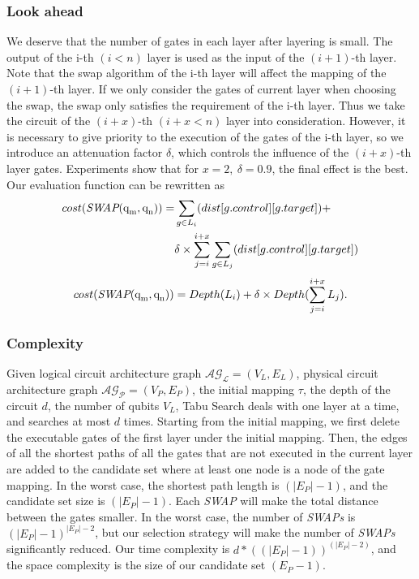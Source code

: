 \documentclass[runningheads]{llncs}
\begin{document}
\subsubsection{Look ahead }
We deserve that the number of gates in each layer after layering is small. The output of the i-th $(i<n)$ layer is used as the input of the $(i+1)$-th layer. Note that the swap algorithm of the i-th layer will affect the mapping of the $(i+1)$-th layer. If we only consider the gates of current layer when choosing the swap, the swap only satisfies the requirement of the i-th layer. Thus we take the circuit of the $(i+x)$-th $(i+x< n)$ layer into consideration. However, it is necessary to give priority to the execution of the gates of the i-th layer, so we introduce an attenuation factor $\delta$, which controls the influence of the $(i+x)$-th layer gates. Experiments show that for $x=2,\ \delta=0.9$, the final effect is the best. Our evaluation function can be rewritten as
 \begin{equation}
	 	\begin{aligned}
			cost(\textit{SWAP}(\textup{q}_\textup{m},\textup{q}_\textup{n}))=&\sum_{g \in L_{i}}(dist[g.control][g.target])+\\
	&\delta \times \sum_{j=i}^{i+x}\sum_{g \in L_{j}}(dist[g.control][g.target])
	\label{cost_num_look}
	\end{aligned}
 \end{equation}
	\begin{equation}
		cost(\textit{SWAP}(\textup{q}_\textup{m},\textup{q}_\textup{n}))= Depth(L_{i})+\delta \times Depth(\sum_{j=i}^{i+x}L_{j}).
		\label{cost_depth_look}
		\end{equation}
\subsubsection{Complexity}
Given logical circuit architecture graph  $\mathcal{AG_{L}}=(V_{L},E_{L})$, physical circuit architecture graph $\mathcal{AG_{P}}=(V_{P},E_{P})$, the initial mapping $\tau$, the depth of the circuit $d$, the number of qubits $V_{L}$, Tabu Search deals with one layer at a time, and searches at most $d$ times. Starting from the initial mapping, we first delete the executable gates of the first layer under the initial mapping. Then, the edges of all the shortest paths of all the gates that are not executed in the current layer are added to the candidate set where at least one node is a node of the gate mapping. In the worst case, the shortest path length is $(|E_{P}|-1)$, 
and the candidate set size is $(|E_{P}|-1)$. Each \textit{SWAP} will make the total distance between the gates smaller. In the worst case, the number of \textit{SWAPs} is $(|E_{P}|-1)^{|E_{P}|-2}$, but our selection strategy will make the number of \textit{SWAPs} significantly reduced. Our time complexity is $d*((|E_{P}|-1))^{(|E_{P}|-2)}$, and the space complexity is the size of our candidate set $(E_{P}-1)$.
\end{document}
